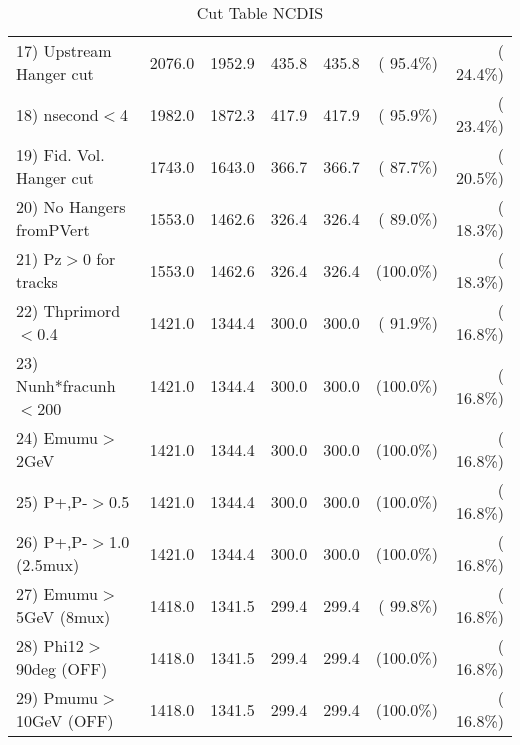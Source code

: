 \begin{table}[h!]
\begin{tabular}{||l||r|r|r|r|r|r||}
 17) Upstream Hanger cut  &       2076.0 &       1952.9 &        435.8 &        435.8 & ( 95.4\%) & ( 24.4\%) \\
 18) nsecond$<$4          &       1982.0 &       1872.3 &        417.9 &        417.9 & ( 95.9\%) & ( 23.4\%) \\
 19) Fid. Vol. Hanger cut &       1743.0 &       1643.0 &        366.7 &        366.7 & ( 87.7\%) & ( 20.5\%) \\
 20) No Hangers fromPVert &       1553.0 &       1462.6 &        326.4 &        326.4 & ( 89.0\%) & ( 18.3\%) \\
 21) Pz$>$0 for tracks    &       1553.0 &       1462.6 &        326.4 &        326.4 & (100.0\%) & ( 18.3\%) \\
 22) Thprimord$<$0.4      &       1421.0 &       1344.4 &        300.0 &        300.0 & ( 91.9\%) & ( 16.8\%) \\
 23) Nunh*fracunh$<$200   &       1421.0 &       1344.4 &        300.0 &        300.0 & (100.0\%) & ( 16.8\%) \\
 24) Emumu$>$2GeV         &       1421.0 &       1344.4 &        300.0 &        300.0 & (100.0\%) & ( 16.8\%) \\
 25) P+,P-$>$0.5          &       1421.0 &       1344.4 &        300.0 &        300.0 & (100.0\%) & ( 16.8\%) \\
 26) P+,P-$>$1.0 (2.5mux) &       1421.0 &       1344.4 &        300.0 &        300.0 & (100.0\%) & ( 16.8\%) \\
 27) Emumu$>$5GeV  (8mux) &       1418.0 &       1341.5 &        299.4 &        299.4 & ( 99.8\%) & ( 16.8\%) \\
 28) Phi12$>$90deg  (OFF) &       1418.0 &       1341.5 &        299.4 &        299.4 & (100.0\%) & ( 16.8\%) \\
 29) Pmumu$>$10GeV  (OFF) &       1418.0 &       1341.5 &        299.4 &        299.4 & (100.0\%) & ( 16.8\%) \\
 \hline
 \hline
 \end{tabular}
 \caption{Cut Table  NCDIS    }
 \label{tab-cutcohjpsi-mumu_ncdis}
 \end{table}
